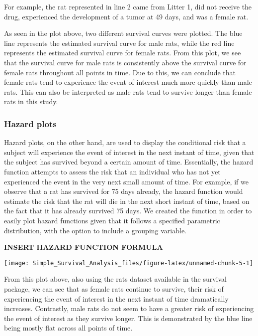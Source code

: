 For example, the rat represented in line 2 came from Litter 1, did not
receive the drug, experienced the development of a tumor at 49 days, and
was a female rat.

As seen in the plot above, two different survival curves were plotted.
The blue line represents the estimated survival curve for male rats,
while the red line represents the estimated survival curve for female
rats. From this plot, we see that the survival curve for male rats is
consistently above the survival curve for female rats throughout all
points in time. Due to this, we can conclude that female rats tend to
experience the event of interest much more quickly than male rats. This
can also be interpreted as male rats tend to survive longer than female
rats in this study.

\hypertarget{hazard-plots}{%
\subsubsection{Hazard plots}\label{hazard-plots}}

Hazard plots, on the other hand, are used to display the conditional
risk that a subject will experience the event of interest in the next
instant of time, given that the subject has survived beyond a certain
amount of time. Essentially, the hazard function attempts to assess the
risk that an individual who has not yet experienced the event in the
very next small amount of time. For example, if we observe that a rat
has survived for 75 days already, the hazard function would estimate the
risk that the rat will die in the next short instant of time, based on
the fact that it has already survived 75 days. We created the
 function in order to easily plot hazard functions given
that it follows a specified parametric distribution, with the option to
include a grouping variable.

\textbf{INSERT HAZARD FUNCTION FORMULA}

\begin{Schunk}

\texttt{[image: Simple\_Survival\_Analysis\_files/figure-latex/unnamed-chunk-5-1]} \end{Schunk}

From this plot above, also using the rats dataset available in the
survival package, we can see that as female rats continue to survive,
their risk of experiencing the event of interest in the next instant of
time dramatically increases. Contrastly, male rats do not seem to have a
greater risk of experiencing the event of interest as they survive
longer. This is demonstrated by the blue line being mostly flat across
all points of time.

